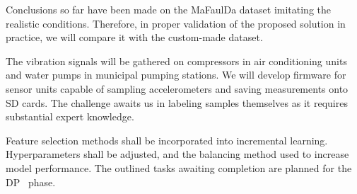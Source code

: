 Conclusions so far have been made on the MaFaulDa dataset imitating the realistic conditions. Therefore, in proper validation of the proposed solution in practice, we will compare it with the custom-made dataset. 

The vibration signals will be gathered on compressors in air conditioning units and water pumps in municipal pumping stations. We will develop firmware for sensor units capable of sampling accelerometers and saving measurements onto SD cards. The challenge awaits us in labeling samples themselves as it requires substantial expert knowledge. 

Feature selection methods shall be incorporated into incremental learning. Hyperparameters shall be adjusted, and the balancing method used to increase model performance. The outlined tasks awaiting completion are planned for the DP~ phase.